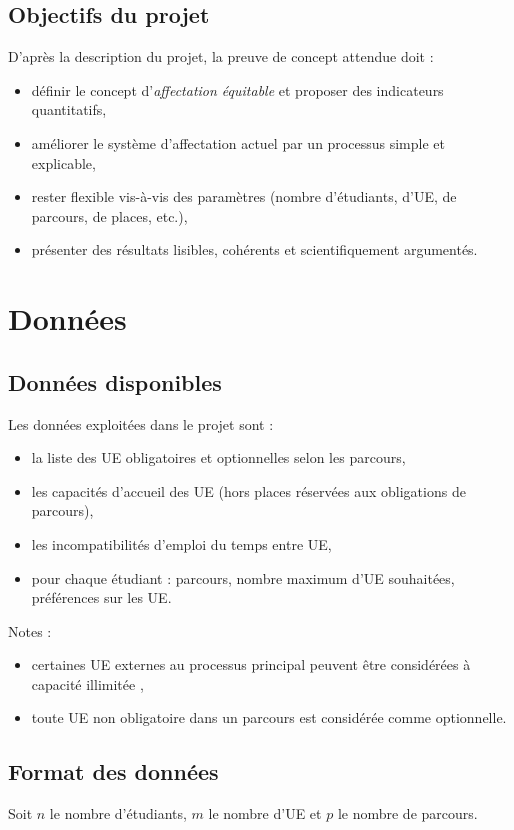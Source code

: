\documentclass{rapport}
\theoremstyle{definition}
\theoremstyle{remark}
\theoremstyle{plain}
\theoremstyle{definition}
\theoremstyle{remark}
\begin{document}
\subsection{Objectifs du projet}
D'après la description du projet, la preuve de concept attendue doit :
\begin{itemize}
    \item définir le concept d'\emph{affectation équitable} et proposer des indicateurs quantitatifs,
    \item améliorer le système d'affectation actuel par un processus simple et explicable,
    \item rester flexible vis-à-vis des paramètres (nombre d'étudiants, d'UE, de parcours, de places, etc.),
    \item présenter des résultats lisibles, cohérents et scientifiquement argumentés.
\end{itemize}

\section{Données}
\subsection{Données disponibles}
Les données exploitées dans le projet sont :
\begin{itemize}
    \item la liste des UE obligatoires et optionnelles selon les parcours,
    \item les capacités d'accueil des UE (hors places réservées aux obligations de parcours),
    \item les incompatibilités d'emploi du temps entre UE,
    \item pour chaque étudiant : parcours, nombre maximum d'UE souhaitées, préférences sur les UE.
\end{itemize}

Notes :
\begin{itemize}
    \item certaines UE externes au processus principal peuvent être considérées à capacité \og illimitée \fg{},
    \item toute UE non obligatoire dans un parcours est considérée comme optionnelle.
\end{itemize}

\subsection{Format des données}
Soit $n$ le nombre d'étudiants, $m$ le nombre d'UE et $p$ le nombre de parcours.
\end{document}
